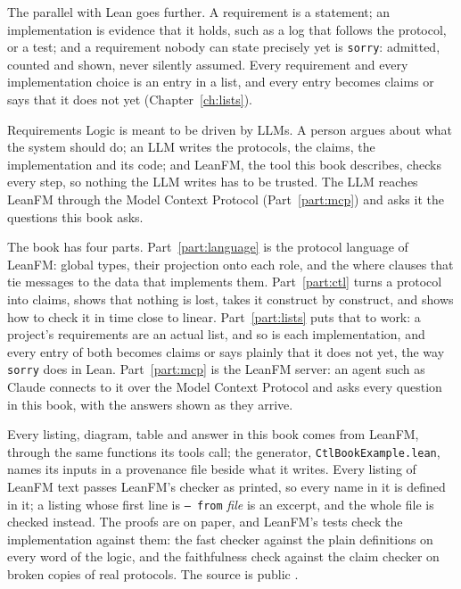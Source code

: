 \documentclass[11pt,oneside]{book}
\theoremstyle{remark}
\begin{document}
The parallel with Lean goes further. A requirement is a statement; an implementation is
evidence that it holds, such as a log that follows the protocol, or a test; and a
requirement nobody can state precisely yet is \texttt{sorry}: admitted, counted and shown,
never silently assumed. Every requirement and every implementation choice is an entry in a
list, and every entry becomes claims or says that it does not yet (Chapter~\ref{ch:lists}).

Requirements Logic is meant to be driven by LLMs. A person argues about what the system
should do; an LLM writes the protocols, the claims, the implementation and its code; and
LeanFM, the tool this book describes, checks every step, so nothing the LLM writes has to be
trusted. The LLM reaches LeanFM through the Model Context Protocol (Part~\ref{part:mcp}) and
asks it the questions this book asks.

The book has four parts. Part~\ref{part:language} is the protocol language of
LeanFM: global types, their projection onto each role, and the where clauses that
tie messages to the data that implements them. Part~\ref{part:ctl} turns a
protocol into claims, shows that nothing is lost, takes it construct by construct,
and shows how to check it in time close to linear. Part~\ref{part:lists} puts that to
work: a project's requirements are an actual list, and so is each implementation, and
every entry of both becomes claims or says plainly that it does not yet, the way
\texttt{sorry} does in Lean. Part~\ref{part:mcp} is the
LeanFM server: an agent such as Claude connects to it over the Model Context
Protocol and asks every question in this book, with the answers shown as they
arrive.

Every listing, diagram, table and answer in this book comes from LeanFM, through
the same functions its tools call; the generator, \texttt{CtlBookExample.lean},
names its inputs in a provenance file beside what it writes. Every listing of LeanFM
text passes LeanFM's checker as printed, so every name in it is defined in it; a listing
whose first line is \texttt{-- from} \emph{file} is an excerpt, and the whole file is
checked instead. The proofs are on paper, and LeanFM's tests check the implementation against them: the fast
checker against the plain definitions on every word of the logic, and the faithfulness check
against the claim checker on broken copies of real protocols. The source is public
\citep{leanfmrepo}.

\tableofcontents

\mainmatter


\end{document}
